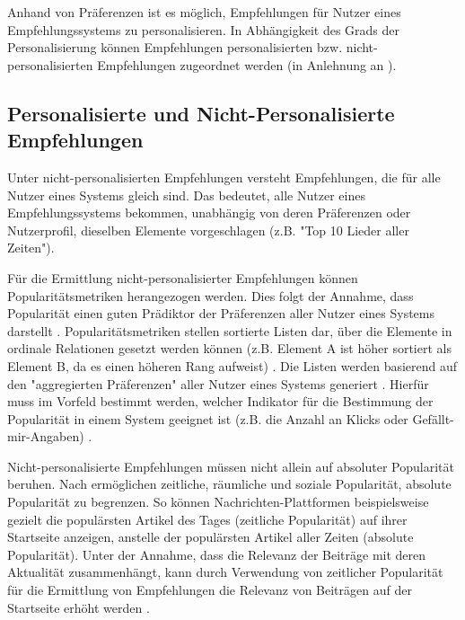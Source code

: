 Anhand von Präferenzen ist es möglich, Empfehlungen für Nutzer eines Empfehlungssystems zu personalisieren.
In Abhängigkeit des Grads der Personalisierung können Empfehlungen personalisierten bzw. nicht-personali\-sierten Empfehlungen zugeordnet werden (in Anlehnung an \cite[S. 400]{unternährer:article}).

\subsection{Personalisierte und Nicht-Personalisierte Empfehlungen}
Unter nicht-personalisierten Empfehlungen versteht \textcite[S. 400]{unternährer:article} Empfehlungen, die für alle Nutzer eines Systems gleich sind.
Das bedeutet, alle Nutzer eines Empfehlungssystems bekommen, unabhängig von deren Präferenzen oder Nutzerprofil, dieselben Elemente vorgeschlagen (z.B. "Top 10 Lieder aller Zeiten").

Für die Ermittlung nicht-personalisierter Empfehlungen können Popularitätsmetriken herangezogen werden.
Dies folgt der Annahme, dass Popularität einen guten Prädiktor der Präferenzen aller Nutzer eines Systems darstellt \cite[S. 406]{unternährer:article}.
Popularitätsmetriken stellen sortierte Listen dar, über die Elemente in ordinale Relationen gesetzt werden können (z.B. Element A ist höher sortiert als Element B, da es einen höheren Rang aufweist) \cite[S. 404ff.]{unternährer:article}.
Die Listen werden basierend auf den "aggregierten Präferenzen" aller Nutzer eines Systems generiert \cite[S. 404]{unternährer:article}.
Hierfür muss im Vorfeld bestimmt werden, welcher Indikator für die Bestimmung der Popularität in einem System geeignet ist (z.B. die Anzahl an Klicks oder Gefällt-mir-Angaben) \cite[S. 406]{unternährer:article}.

Nicht-personalisierte Empfehlungen müssen nicht allein auf absoluter Popularität beruhen.
Nach \textcite[S. 405]{unternährer:article} ermöglichen zeitliche, räumliche und soziale Popularität, absolute Popularität zu begrenzen.
So können Nachrichten-Plattformen beispielsweise gezielt die populärsten Artikel des Tages (zeitliche Popularität) auf ihrer Startseite anzeigen, anstelle der populärsten Artikel aller Zeiten (absolute Popularität).
Unter der Annahme, dass die Relevanz der Beiträge mit deren Aktualität zusammenhängt, kann durch Verwendung von zeitlicher Popularität für die Ermittlung von Empfehlungen die Relevanz von Beiträgen auf der Startseite erhöht werden \cite[S. 405]{unternährer:article}.

